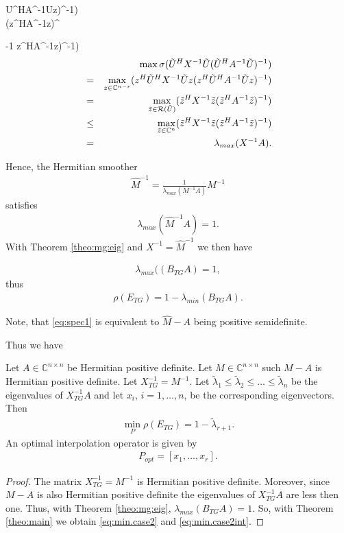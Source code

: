 \documentclass[final]{amsart}
\newcommand{\innCnmr}{\in\mathbb{C}^{n-r}}
\newcommand{\beqo}{\begin{eqnarray*}}
\newcommand{\beq}{\begin{eqnarray}}
\newcommand{\eeqo}{\end{eqnarray*}}
\newcommand{\eeq}{\end{eqnarray}}
\numberwithin{equation}{section}
\newcommand{\ran} {{\cal R}}
\newcommand{\bCn}{\mathbb{C}^n}
\newcommand{\inCnn}{\in \mathbb{C}^{n \times n}}
\begin{document}
U^HA^{-1}\tilde Uz)^{-1})\\
(\tilde z^HA^{-1}\tilde z)^{-1%
z^HA^{-1}\tilde z)^{-1})\\

\beqo
& &  \max \sigma(\tilde U^HX^{-1}\tilde U (\tilde U^HA^{-1}\tilde U)^{-1})\\
& = &  \max_{z \innCnmr} (z^H\tilde U^HX^{-1}\tilde Uz (z^H\tilde
U^HA^{-1}\tilde Uz)^{-1})\\
& = &  \max_{\tilde z \in {\ran (\tilde U)} } (\tilde z^HX^{-1}\tilde z (\tilde
z^HA^{-1}\tilde z)^{-1})\\
& \leq & \max_{\tilde z \in \bCn } (\tilde z^HX^{-1}\tilde z (\tilde
z^HA^{-1}\tilde z)^{-1})\\
& = & \lambda_{max}(X^{-1}A).
\eeqo

Hence, the  Hermitian smoother
\beqo
\hat M^{-1} = \frac{1}{\lambda_{max}(M^{-1}A)}M^{-1}
\eeqo
satisfies
\beq \label{eq:spec1}
\lambda_{max}(\hat M^{-1}A) = 1.
\eeq
With Theorem \ref{theo:mg:eig} and $X^{-1} = \hat M^{-1}$ we then have 

\beqo
\lambda_{max} ((B_{TG}A) = 1,
\eeqo
thus
\beqo
\rho(E_{TG}) = 1 - \lambda_{min } (B_{TG}A).
\eeqo

Note, that \eqref{eq:spec1} is equivalent to  $\hat M - A $ being positive
semidefinite.

Thus we  have 






\begin{corollary} \label{coro:two}
Let  $A\inCnn$  be Hermitian positive definite. Let $ M \inCnn$ such $M - A$ is
Hermitian positive definite.
Let $X_{TG}^{-1} =  M^{-1}$.   
 Let $
\tilde \lambda_1 \leq \tilde \lambda_2 \leq \ldots \leq  \tilde \lambda_n $
be the  eigenvalues of $X_{TG}^{-1}A$  and let $x_i$, $i = 1, \ldots, n$, be
the corresponding eigenvectors. Then
\beq \label{eq:min.case2}
\min_{P}\rho(E_{TG}) = 1 - \tilde \lambda_{r+1}.
\eeq
An optimal interpolation operator is given by 
\beq  \label{eq:min.case2int}
P_{opt} = [x_{1}, \ldots , x_r].
\eeq
\end{corollary}
\begin{proof}
The matrix $X_{TG}^{-1} = M^{-1}$ is Hermitian positive definite. Moreover,
since $M - A$ is also Hermitian positive definite the eigenvalues of
$X_{TG}^{-1}A$ are less then  one. Thus, with Theorem \ref{theo:mg:eig},
$\lambda_{max}(B_{TG}A) = 1$.  So, with  Theorem \ref{theo:main}  we obtain
\eqref{eq:min.case2} and \eqref{eq:min.case2int}.
\end{proof}

}
\end{document}
